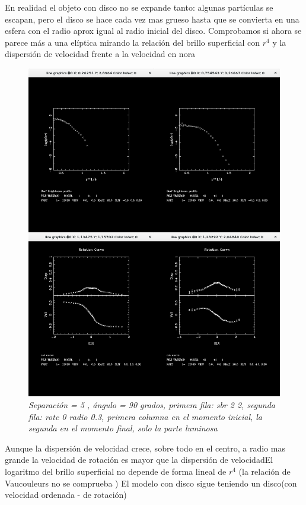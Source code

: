 \documentclass[12pt]{article} %
\renewcommand{\=}[1]{\stackrel{#1}{=}} %
\theoremstyle{definition}
\theoremstyle{remark}
\begin{document}
En realidad el objeto con disco no se expande tanto: algunas partículas se escapan, pero el disco se hace cada vez mas grueso hasta que se convierta  en  una esfera con el radio aprox igual al radio inicial del disco. Comprobamos si ahora se parece más a una elíptica mirando la relación del brillo superficial con $r^4$ y la dispersión de velocidad frente a la velocidad en nora

\begin{figure}[!ht]
 \centering
 \includegraphics[scale=0.3]{noraellip.png}
 \caption{\emph{ Separación = 5 , ángulo = 90 grados, primera fila: sbr 2 2, segunda fila: rotc 0 radio 0.3, primera columna en el momento inicial, la segunda en el momento final, solo la parte luminosa  }}
\end{figure}

Aunque la dispersión de velocidad crece, sobre todo en el centro, a radio mas grande la velocidad de rotación es mayor que la dispersión de velocidadEl logaritmo del brillo superficial no depende de forma lineal de $r^4$ (la relación de  Vaucouleurs no se comprueba )
El modelo con disco sigue teniendo un disco(con velocidad ordenada - de rotación)
\end{document}
